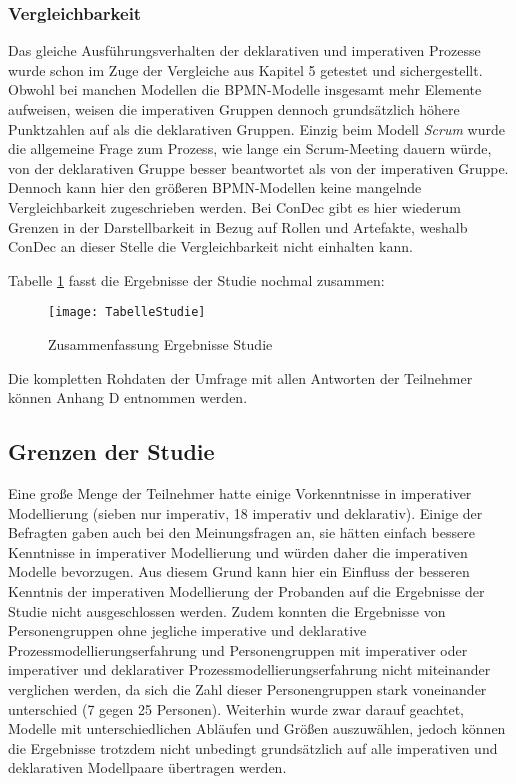 \subsubsection{Vergleichbarkeit}
Das gleiche Ausführungsverhalten der deklarativen und imperativen Prozesse wurde schon im Zuge der Vergleiche aus Kapitel 5 getestet und sichergestellt. \newline
Obwohl bei manchen Modellen die BPMN-Modelle insgesamt mehr Elemente aufweisen, weisen die imperativen Gruppen dennoch grundsätzlich höhere Punktzahlen auf als die deklarativen Gruppen. Einzig beim Modell \textit{Scrum} wurde die allgemeine Frage zum Prozess, wie lange ein Scrum-Meeting dauern würde, von der deklarativen Gruppe besser beantwortet als von der imperativen Gruppe. Dennoch kann hier den größeren BPMN-Modellen keine mangelnde Vergleichbarkeit zugeschrieben werden.\newline
Bei ConDec gibt es hier wiederum Grenzen in der Darstellbarkeit in Bezug auf Rollen und Artefakte, weshalb ConDec an dieser Stelle die Vergleichbarkeit nicht einhalten kann.\newline


Tabelle \ref{fig:TabelleStudie} fasst die Ergebnisse der Studie nochmal zusammen:

\begin{figure}[htp]
\begin{center}
  \texttt{[image: TabelleStudie]} %
  \caption{Zusammenfassung Ergebnisse Studie}
  \label{fig:TabelleStudie}
\end{center}
\end{figure}

Die kompletten Rohdaten der Umfrage mit allen Antworten der Teilnehmer können Anhang D entnommen werden.

\subsection{Grenzen der Studie}

Eine große Menge der Teilnehmer hatte einige Vorkenntnisse in imperativer Modellierung (sieben nur imperativ, 18 imperativ und deklarativ). Einige der Befragten gaben auch bei den Meinungsfragen an, sie hätten einfach bessere Kenntnisse in imperativer Modellierung und würden daher die imperativen Modelle bevorzugen. Aus diesem Grund kann hier ein Einfluss der besseren Kenntnis der imperativen Modellierung der Probanden auf die Ergebnisse der Studie nicht ausgeschlossen werden. \newline 
Zudem konnten die Ergebnisse von Personengruppen ohne jegliche imperative und deklarative Prozessmodellierungserfahrung und Personengruppen mit imperativer oder imperativer und deklarativer Prozessmodellierungserfahrung nicht miteinander verglichen werden, da sich die Zahl dieser Personengruppen stark voneinander unterschied (7 gegen 25 Personen).\newline
Weiterhin wurde zwar darauf geachtet, Modelle mit unterschiedlichen Abläufen und Größen auszuwählen, jedoch können die Ergebnisse trotzdem nicht unbedingt grundsätzlich auf alle imperativen und deklarativen Modellpaare übertragen werden. \newline

 










